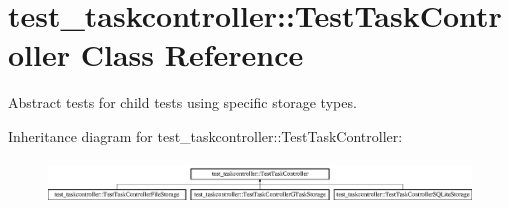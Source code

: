 \hypertarget{classtest__taskcontroller_1_1TestTaskController}{
\section{test\-\_\-taskcontroller\-:\-:\-Test\-Task\-Controller \-Class \-Reference}
\label{classtest__taskcontroller_1_1TestTaskController}
}


\-Abstract tests for child tests using specific storage types.  


\-Inheritance diagram for test\-\_\-taskcontroller\-:\-:\-Test\-Task\-Controller\-:\begin{figure}[H]
\begin{center}
\leavevmode
\includegraphics[height=1.185185cm]{classtest__taskcontroller_1_1TestTaskController}
\end{center}
\end{figure}

